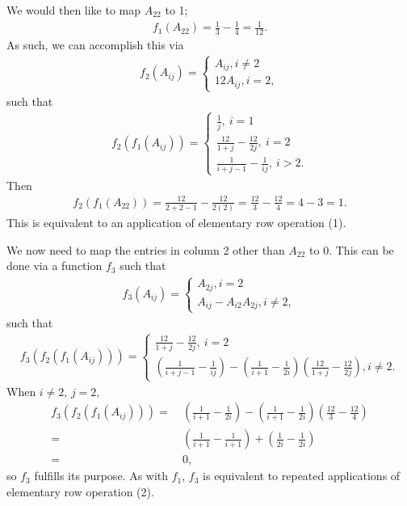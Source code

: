 \documentclass[12pt]{article}
\begin{document}
\begin{enumerate}
    We would then like to map $A_{22}$ to 1;
    \begin{align*}
      f_1(A_{22}) = \frac{1}{3} - \frac{1}{4} = \frac{1}{12}.
    \end{align*}
    As such, we can accomplish this via
    \begin{align*}
      f_2(A_{ij}) =
      \begin{cases}
        A_{ij}, i \neq 2\\
        12A_{ij}, i = 2,
      \end{cases}
    \end{align*}
    such that
    \begin{align*}
      f_2(f_1(A_{ij})) =
      \begin{cases}
        \frac{1}{j},\ i = 1\\
        \frac{12}{1 + j} - \frac{12}{2j},\ i = 2\\
        \frac{1}{i + j - 1} - \frac{1}{ij},\ i > 2.
      \end{cases}
    \end{align*}
    Then
    \begin{align*}
      f_2(f_1(A_{22}))
        = \frac{12}{2 + 2 - 1} - \frac{12}{2(2)}
        = \frac{12}{3} - \frac{12}{4} = 4 - 3 = 1.
    \end{align*}
    This is equivalent to an application of elementary row
    operation (1).

    We now need to map the entries in column 2 other than
    $A_{22}$ to 0. This can be done via a function $f_3$ such
    that
    \begin{align*}
      f_3(A_{ij}) =
      \begin{cases}
        A_{2j}, i = 2\\
        A_{ij} - A_{i2}A_{2j}, i \neq 2,
      \end{cases}
    \end{align*}
    such that
    \begin{align*}
      f_3(f_2(f_1(A_{ij}))) =
      \begin{cases}
        \frac{12}{1 + j} - \frac{12}{2j},\ i = 2\\
        (\frac{1}{i + j - 1} - \frac{1}{ij})
          - (\frac{1}{i + 1} - \frac{1}{2i})(\frac{12}{1 + j} -
          \frac{12}{2j}), i \neq 2.
      \end{cases}
    \end{align*}
    When $i \neq 2$, $j = 2$,
    \begin{align*}
      f_3(f_2(f_1(A_{ij})))
      =&\ (\frac{1}{i + 1} - \frac{1}{2i})
          - (\frac{1}{i + 1} - \frac{1}{2i})(\frac{12}{3} -
          \frac{12}{4})\\
      =&\ (\frac{1}{i + 1}
          - \frac{1}{i + 1})
          + (\frac{1}{2i}
          - \frac{1}{2i})\\
      =&\ 0,
    \end{align*}
    so $f_3$ fulfills its purpose. As with $f_1$, $f_3$ is
    equivalent to repeated applications of elementary row
    operation (2).


\end{enumerate}
\end{document}
